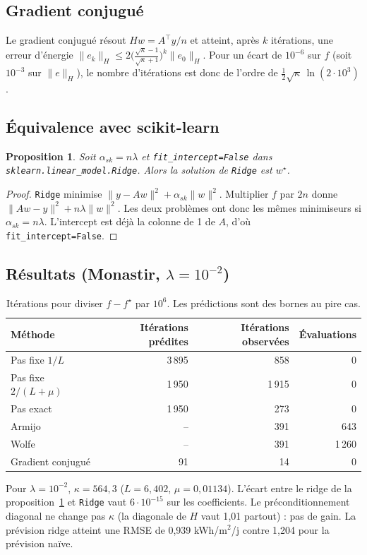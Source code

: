 \documentclass[11pt,a4paper]{article}
\newtheorem{proposition}[theorem]{Proposition}
\theoremstyle{remark}
\theoremstyle{definition}
\newcommand{\T}{^{\top}}
\begin{document}
\subsection{Gradient conjugué}
Le gradient conjugué résout $Hw = A\T y/n$ et atteint, après $k$ itérations, une erreur d'énergie
$\|e_k\|_H \le 2\bigl(\tfrac{\sqrt\kappa-1}{\sqrt\kappa+1}\bigr)^k\|e_0\|_H$. Pour un écart de $10^{-6}$ sur $f$ (soit $10^{-3}$ sur $\|e\|_H$), le nombre
d'itérations est donc de l'ordre de $\tfrac12\sqrt\kappa\,\ln(2\cdot10^3)$.

\subsection{Équivalence avec scikit-learn}
\begin{proposition}\label{prop:sk}
Soit $\alpha_{sk} = n\lambda$ et \texttt{fit\_intercept=False} dans \texttt{sklearn.linear\_model.Ridge}. Alors la solution de \texttt{Ridge} est $w^\star$.
\end{proposition}
\begin{proof}
\texttt{Ridge} minimise $\|y - Aw\|^2 + \alpha_{sk}\|w\|^2$. Multiplier $f$ par $2n$ donne $\|Aw-y\|^2 + n\lambda\|w\|^2$.
Les deux problèmes ont donc les mêmes minimiseurs si $\alpha_{sk} = n\lambda$. L'intercept est déjà la colonne de 1 de $A$, d'où \texttt{fit\_intercept=False}.
\end{proof}

\subsection{Résultats (Monastir, $\lambda = 10^{-2}$)}
\begin{table}[h]\centering
\begin{tabular}{lrrr}
\toprule
Méthode & Itérations prédites & Itérations observées & Évaluations \\
\midrule
Pas fixe $1/L$ & 3\,895 & 858 & 0 \\
Pas fixe $2/(L+\mu)$ & 1\,950 & 1\,915 & 0 \\
Pas exact & 1\,950 & 273 & 0 \\
Armijo & -- & 391 & 643 \\
Wolfe & -- & 391 & 1\,260 \\
Gradient conjugué & 91 & 14 & 0 \\
\bottomrule
\end{tabular}
\caption{Itérations pour diviser $f - f^\star$ par $10^6$. Les prédictions sont des bornes au pire cas.}
\end{table}
Pour $\lambda = 10^{-2}$, $\kappa = 564{,}3$ ($L = 6{,}402$, $\mu = 0{,}01134$). L'écart entre le ridge de la proposition~\ref{prop:sk} et \texttt{Ridge} vaut $6\cdot10^{-15}$
sur les coefficients. Le préconditionnement diagonal ne change pas $\kappa$ (la diagonale de $H$ vaut 1{,}01 partout) : pas de gain.
La prévision ridge atteint une RMSE de 0,939 kWh/m$^2$/j contre 1,204 pour la prévision naïve.
\end{document}
